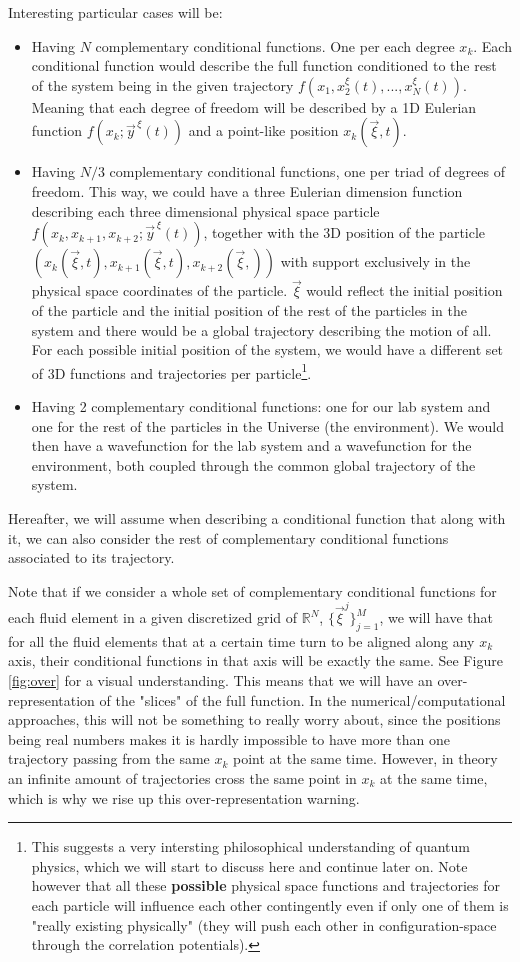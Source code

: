 \documentclass[11pt, a4paper]{article} %
\newcommand{\R}{\mathbb{R}} %
\begin{document}
Interesting particular cases will be:
\begin{itemize}
\item Having $N$ complementary conditional functions. One per each degree $x_k$. Each conditional function would describe the full function conditioned to the rest of the system being in the given trajectory $f(x_1,x_2^\xi(t),...,x_N^\xi(t))$. Meaning that each degree of freedom will be described by a 1D Eulerian function $f(x_k;\vec{y}^{\, \xi}(t))$ and a point-like position $x_k(\vec{\xi},t)$.
\item Having $N/3$ complementary conditional functions, one per triad of degrees of freedom. This way, we could have a three Eulerian dimension function describing each three dimensional physical space particle $f(x_k,x_{k+1},x_{k+2}; \vec{y}^{\, \xi}(t))$, together with the 3D position of the particle $(x_{k}(\vec{\xi},t), x_{k+1}(\vec{\xi},t),x_{k+2}(\vec{\xi},))$ with support exclusively in the physical space coordinates of the particle. $\vec{\xi}$ would reflect the initial position of the particle and the initial position of the rest of the particles in the system and there would be a global trajectory describing the motion of all. For each possible initial position of the system, we would have a different set of 3D functions and trajectories per particle\footnote{ This suggests a very intersting philosophical understanding of quantum physics, which we will start to discuss here and continue later on. Note however that all these {\bf possible} physical space functions and trajectories for each particle will influence each other contingently even if only one of them is "really existing physically" (they will push each other in configuration-space through the correlation potentials).}.
\item Having 2 complementary conditional functions: one for our lab system and one for the rest of the particles in the Universe (the environment). We would then have a wavefunction for the lab system and a wavefunction for the environment, both coupled through the common global trajectory of the system.
\end{itemize} 
Hereafter, we will assume when describing a conditional function that along with it, we can also consider the rest of complementary conditional functions associated to its trajectory.

Note that if we consider a whole set of complementary conditional functions for each fluid element in a given discretized grid of $\R^N$, $\{\vec{\xi}^j\}_{j=1}^M$, we will have that for all the fluid elements that at a certain time turn to be aligned along any $x_k$ axis, their conditional functions in that axis will be exactly the same. See Figure \ref{fig:over} for a visual understanding. This means that we will have an over-representation of the "slices" of the full function. In the numerical/computational approaches, this will not be something to really worry about, since the positions being real numbers makes it is hardly impossible to have more than one trajectory passing from the same $x_k$ point at the same time. However, in theory an infinite amount of trajectories cross the same point in $x_k$ at the same time, which is why we rise up this over-representation warning.\vspace{0.5cm}
\end{document}
